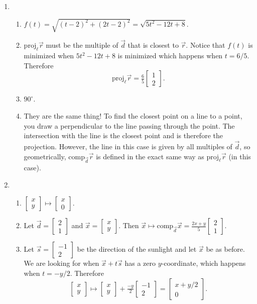 \documentclass[red]{tutorial}
\newcommand{\Proj}{\mathrm{proj}}
\newcommand{\Comp}{\mathrm{comp}}
\newcommand{\mat}[1]{\begin{bmatrix}#1\end{bmatrix}}
\theoremstyle{definition}
\theoremstyle{theorem}
\begin{document}
\begin{solutions}
\begin{enumerate}
\begin{enumerate}
\end{enumerate}

	\item \begin{enumerate}
			\item $f(t) = \sqrt{(t-2)^2+(2t-2)^2} = \sqrt{5t^2-12t+8}$.
			\item $\Proj_\ell \vec r$ must be the multiple of $\vec d$ that is
				closest to $\vec r$. Notice that $f(t)$ is minimized when
				$5t^2-12t+8$ is minimized which happens when $t=6/5$. Therefore
				\[
					\Proj_\ell \vec r = \tfrac{6}{5}\mat{1\\2}.
				\]
			\item $90^\circ$.
			\item They are the same thing! To find the closest point on a line
				to a point, you draw a perpendicular to the line passing through the point.
				The intersection with the line is the closest point and is therefore the projection.
				However, the line in this case is given by
				all multiples of $\vec d$, so geometrically, 
				$\Comp_{\vec d}\vec r$ is defined in the exact same way as $\Proj_\ell \vec r$ (in this case).
	\end{enumerate}
		\item  \begin{enumerate}
				\item $\mat{x\\y}\mapsto \mat{x\\0}$.
			\item Let $\vec d=\mat{2\\1}$ and $\vec x=\mat{x\\y}$. 
				Then $\vec x\mapsto \Comp_{\vec d}\vec x = \frac{2x+y}{5}\mat{2\\1}$.
			\item Let $\vec s=\mat{-1\\2}$ be the direction of the sunlight and let $\vec x$ be as before. 
				We are looking for when $\vec x+t\vec s$ has a zero $y$-coordinate, which happens when
				$t=-y/2$. Therefore
				\[
					\mat{x\\y}\mapsto \mat{x\\y}+\tfrac{-y}{2}\mat{-1\\2} = \mat{x+y/2\\0}.
				\]
		\end{enumerate}

		\end{enumerate}
	


	\end{solutions}
\end{document}
